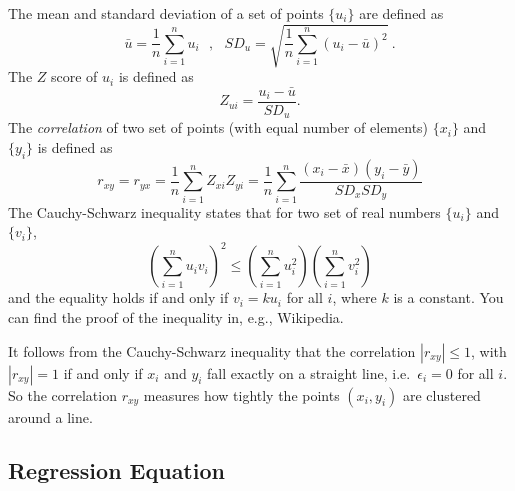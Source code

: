 \documentclass[11pt]{article}
\newcommand{\beq}{\begin{equation}}
\newcommand{\eeq}{\end{equation}}
\begin{document}
The mean and standard deviation of a set of points $\{ u_i\}$ are defined as
\beq
  \bar{u} = \frac{1}{n} \sum_{i=1}^n u_i \ \ \ , \ \ \
  SD_u = \sqrt{ \frac{1}{n} \sum_{i=1}^n (u_i-\bar{u})^2 }  \ .
\label{def:mean_std}
\eeq
The $Z$ score of $u_i$ is defined as
\beq
  Z_{u i} = \frac{u_i-\bar{u}}{SD_u} .
\label{def:Zscore}
\eeq
The {\it correlation} of two set of points (with equal number of elements) $\{ x_i \}$
and $\{ y_i \}$ is defined as
\beq
  r_{xy} = r_{yx} = \frac{1}{n} \sum_{i=1}^n Z_{xi} Z_{yi}  
= \frac{1}{n} \sum_{i=1}^n \frac{(x_i-\bar{x})(y_i-\bar{y})}{SD_x SD_y}
\label{def:correlation}
\eeq
The Cauchy-Schwarz inequality states that for two set of real numbers $\{ u_i\}$ 
and $\{ v_i \}$, 
\[
  \left( \sum_{i=1}^n u_i v_i \right)^2 \leq \left( \sum_{i=1}^n u_i^2\right) 
\left( \sum_{i=1}^n v_i^2 \right) 
\]
and the equality holds if and only if $v_i=k u_i$ for all $i$, where $k$ is 
a constant. You can find the proof of the inequality in, e.g., Wikipedia.

It follows from the Cauchy-Schwarz inequality that the correlation 
$|r_{xy}| \leq 1$, with $|r_{xy}|=1$ if and only if $x_i$ and $y_i$ fall 
exactly on a straight line, i.e.\ $\epsilon_i=0$ for all $i$. So 
the correlation $r_{xy}$ measures how tightly the points $(x_i,y_i)$ are clustered 
around a line.

\subsection{Regression Equation}
\label{sec:regeq}
\end{document}
